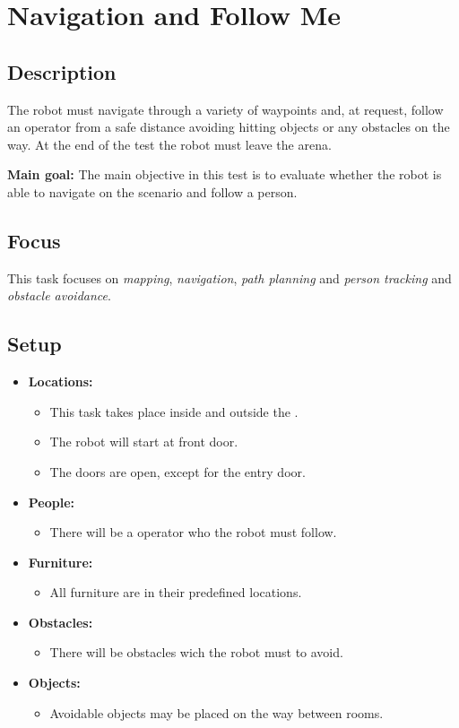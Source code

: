 \section{Navigation and Follow Me}
\label{test:navigation-and-follow-me}

\subsection*{Description}
The robot must navigate through a variety of waypoints and, at request, follow an operator from a safe distance avoiding hitting objects or any obstacles on the way. At the end of the test the robot must leave the arena.

\noindent \textbf{Main goal:}
The main objective in this test is to evaluate whether the robot is able to navigate on the scenario and follow a person.



\subsection*{Focus}
This task focuses on \textit{mapping}, \textit{navigation}, \textit{path planning} and \textit{person tracking} and \textit{obstacle avoidance}.

\subsection*{Setup}
\begin{itemize}[nosep]	
	\item \textbf{Locations:} 
	\begin{itemize}
		\item This task takes place inside and outside the \Arena{}.
		\item The robot will start at front door.
		\item The doors are open, except for the entry door.
	\end{itemize}	 
	\item \textbf{People:} 
	\begin{itemize}
		\item There will be a operator who the robot must follow.
	\end{itemize}
	\item \textbf{Furniture:} 
	\begin{itemize}
		\item All furniture are in their predefined locations.
	\end{itemize}
	\item \textbf{Obstacles:} 
	\begin{itemize}
		\item There will be obstacles wich the robot must to avoid.
	\end{itemize}
    \item \textbf{Objects:} 
    \begin{itemize}
		\item Avoidable objects may be placed on the way between rooms.
	\end{itemize}
\end{itemize}

